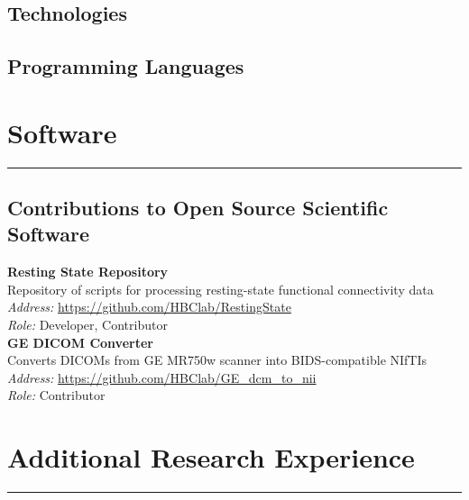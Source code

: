 \documentclass[11pt,letterpaper,sans]{moderncv}
\begin{document}
\subsection{Technologies}

\subsection{Programming Languages}

\bigskip{}
\section{Software} \smallskip \hrule \medskip
\subsection{Contributions to Open Source Scientific Software}
\textbf{Resting State Repository} \\
Repository of scripts for processing resting-state functional connectivity data\\
\emph{Address:} \href{https://github.com/HBClab/RestingState}{https://github.com/HBClab/RestingState}\\
\emph{Role:} Developer, Contributor\\

\textbf{GE DICOM Converter} \\
Converts DICOMs from GE MR750w scanner into BIDS-compatible NIfTIs\\
\emph{Address:} \href{https://github.com/HBClab/GE_dcm_to_nii}{https://github.com/HBClab/GE\_dcm\_to\_nii}\\
\emph{Role:} Contributor

\bigskip{}
\section{Additional Research Experience} \smallskip \hrule \medskip
\end{document}

